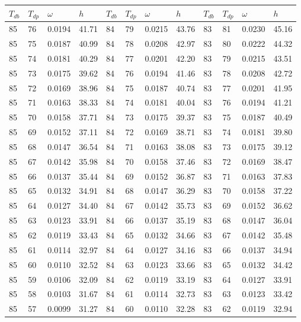 \begin{tabular}{llll|llll|llll}
 \toprule 
\(T_{db}\) & \(T_{dp}\) & \(\omega\) & \(h\) & \(T_{db}\) & \(T_{dp}\) & \(\omega\) & \(h\) & \(T_{db}\) & \(T_{dp}\) & \(\omega\) & \(h\)  \\ \midrule 
85 & 76 & 0.0194 & 41.71 & 84 & 79 & 0.0215 & 43.76 & 83 & 81 & 0.0230 & 45.16\\
85 & 75 & 0.0187 & 40.99 & 84 & 78 & 0.0208 & 42.97 & 83 & 80 & 0.0222 & 44.32\\
85 & 74 & 0.0181 & 40.29 & 84 & 77 & 0.0201 & 42.20 & 83 & 79 & 0.0215 & 43.51\\
85 & 73 & 0.0175 & 39.62 & 84 & 76 & 0.0194 & 41.46 & 83 & 78 & 0.0208 & 42.72\\
85 & 72 & 0.0169 & 38.96 & 84 & 75 & 0.0187 & 40.74 & 83 & 77 & 0.0201 & 41.95\\
85 & 71 & 0.0163 & 38.33 & 84 & 74 & 0.0181 & 40.04 & 83 & 76 & 0.0194 & 41.21\\
85 & 70 & 0.0158 & 37.71 & 84 & 73 & 0.0175 & 39.37 & 83 & 75 & 0.0187 & 40.49\\
85 & 69 & 0.0152 & 37.11 & 84 & 72 & 0.0169 & 38.71 & 83 & 74 & 0.0181 & 39.80\\
85 & 68 & 0.0147 & 36.54 & 84 & 71 & 0.0163 & 38.08 & 83 & 73 & 0.0175 & 39.12\\
85 & 67 & 0.0142 & 35.98 & 84 & 70 & 0.0158 & 37.46 & 83 & 72 & 0.0169 & 38.47\\
85 & 66 & 0.0137 & 35.44 & 84 & 69 & 0.0152 & 36.87 & 83 & 71 & 0.0163 & 37.83\\
85 & 65 & 0.0132 & 34.91 & 84 & 68 & 0.0147 & 36.29 & 83 & 70 & 0.0158 & 37.22\\
85 & 64 & 0.0127 & 34.40 & 84 & 67 & 0.0142 & 35.73 & 83 & 69 & 0.0152 & 36.62\\
85 & 63 & 0.0123 & 33.91 & 84 & 66 & 0.0137 & 35.19 & 83 & 68 & 0.0147 & 36.04\\
85 & 62 & 0.0119 & 33.43 & 84 & 65 & 0.0132 & 34.66 & 83 & 67 & 0.0142 & 35.48\\
85 & 61 & 0.0114 & 32.97 & 84 & 64 & 0.0127 & 34.16 & 83 & 66 & 0.0137 & 34.94\\
85 & 60 & 0.0110 & 32.52 & 84 & 63 & 0.0123 & 33.66 & 83 & 65 & 0.0132 & 34.42\\
85 & 59 & 0.0106 & 32.09 & 84 & 62 & 0.0119 & 33.19 & 83 & 64 & 0.0127 & 33.91\\
85 & 58 & 0.0103 & 31.67 & 84 & 61 & 0.0114 & 32.73 & 83 & 63 & 0.0123 & 33.42\\
85 & 57 & 0.0099 & 31.27 & 84 & 60 & 0.0110 & 32.28 & 83 & 62 & 0.0119 & 32.94\\

\end{tabular}
